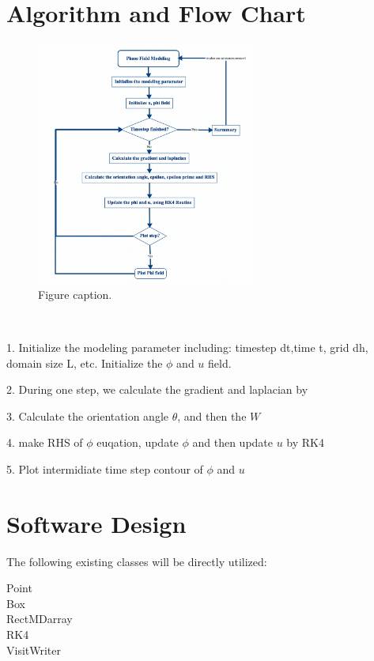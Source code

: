 \documentclass{article}
\begin{document}
\section{Algorithm and Flow Chart}
\begin{figure}[h]
\begin{center}
\includegraphics[width=0.65\textwidth]{flowchart_v_1} %
\caption{Figure caption.}
\end{center}
\end{figure}
        \par \ 
        \par 1. Initialize the modeling parameter including: timestep dt,time t, grid dh, domain size L, etc.  Initialize the $\phi$ and $u$ field.
        \par 2. During one step, we calculate the gradient and laplacian by 
        \par 3. Calculate the orientation angle $\theta$, and then the $W$
        \par 4. make RHS of $\phi$ euqation, update $\phi$ and then update $u$ by RK4
        \par 5. Plot intermidiate time step contour of  $\phi$ and $u$
  
\section{Software Design}
The following existing classes will be directly utilized:
\begin{description}
\item[Point]
\item[Box]
\item[RectMDarray]
\item[RK4]
\item[VisitWriter]
\item[]
\end{description}
\end{document}
